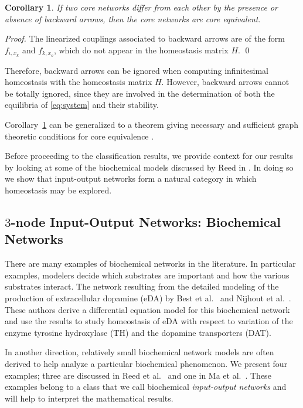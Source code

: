 \documentclass[a4paper,fleqn]{cas-dc}
\newtheorem{corollary}[theorem]{Corollary}
\newcommand{\etal}{\textrm{et al.}}
\begin{document}
\begin{corollary} \label{P:core_equivalent}
If two core networks differ from each other by the presence or absence of backward arrows, then the core networks are core equivalent.
\end{corollary} 
\begin{proof}
The linearized couplings associated to backward arrows are of the form $f_{\iota,x_k}$ and $f_{k,x_o}$, which do not appear in the homeostasis matrix $H$. \qed
\end{proof}

Therefore, backward arrows can be ignored when computing infinitesimal homeostasis with the homeostasis matrix $H$.  However, backward arrows cannot be totally ignored, since they are involved in the determination of both the equilibria of \eqref{eq:system} and their stability.

Corollary~\ref{P:core_equivalent} can be generalized to a theorem giving necessary and sufficient graph theoretic conditions for core equivalence \cite[Theorem 3.3]{wang2021}.

Before proceeding to the classification results, we provide context for our results by looking at some of the biochemical models discussed by Reed in \cite{rbgsn2017}.  
In doing so we show that input-output networks form a natural category in which homeostasis may be explored. 

\subsection{$3$-node Input-Output Networks: Biochemical Networks}
\label{SS:TNION}

There are many examples of biochemical networks in the literature.
In particular 
examples, modelers decide which substrates are important and how the 
various substrates interact.  
The network resulting 
from the detailed modeling of the production of extracellular dopamine (eDA) by 
Best \etal~\cite{best2009} and Nijhout \etal~\cite{nbr2014}.   These authors derive a 
differential equation model for this biochemical network and use the results to 
study homeostasis of eDA with respect to variation of the enzyme tyrosine 
hydroxylase (TH) and the dopamine transporters (DAT).

In another direction, relatively small biochemical network models are often derived to help analyze a particular biochemical phenomenon. We present four examples; three are discussed in 
Reed \etal~\cite{rbgsn2017} and one in Ma \etal~\cite{ma2009}. 
These examples belong to a class that we call biochemical {\em input-output networks} and will help  to interpret the mathematical results.
\end{document}
